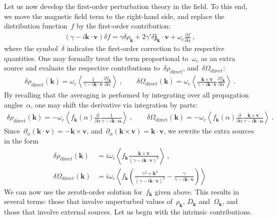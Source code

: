 \documentclass[preprint,aps,eqsecnum]{revtex4-1}
\begin{document}
Let us now develop the first-order perturbation theory in the field.
To this end, we move the magnetic field term to the right-hand
side, and replace the distribution function~$f$ by the first-order
contribution:
\begin{align}
  (\gamma - i {\bm k} \cdot {\bm v})\delta f =
  \gamma \delta \rho_{\bm k} + 2 \gamma' \delta{\bm j}_{\bm k}
  \cdot {\bm v} + \omega_c \frac{\partial f}{\partial \alpha}\ ,
\end{align}
where the symbol~$\delta$ indicates the first-order correction
to the respective quantities. One may formally treat the
term proportional to~$\omega_c$ as an extra source and evaluate
the respective contributions to~$\delta \rho_\mathrm{direct}$,
and~$\delta \Omega_\mathrm{direct}$:
\begin{align}
  \delta \rho_\mathrm{direct}({\bm k})
  = \omega_c \left\langle \frac{1}{\gamma  - i {\bm k}\cdot{\bm v}}
     \frac{\partial f_{\bm k}}{\partial\alpha}
  \right\rangle
  \ ,
  \qquad
  \delta \Omega_\mathrm{direct}({\bm k})
  = \omega_c \left\langle \frac{{\bm k}\times{\bm v}}{
          \gamma  - i {\bm k}\cdot{\bm v}}
     \frac{\partial f_{\bm k}}{\partial\alpha}
  \right\rangle  \ .
\end{align}
By recalling that the averaging is performed by integrating over
all propagation angles~$\alpha$, one may shift the derivative
via integration by parts:
\begin{align}
  \delta \rho_\mathrm{direct}({\bm k})
  = - \omega_c \left\langle f_{\bm k}(\alpha)
  \frac{\partial}{\partial\alpha} \frac{1}{\gamma
      - i {\bm k}\cdot{\bm \alpha}}
  \right\rangle\ ,
  \qquad
  \delta \Omega_\mathrm{direct}({\bm k})
  = - \omega_c \left\langle f_{\bm k}(\alpha)
  \frac{\partial}{\partial\alpha} \frac{{\bm k}\times{\bm v}}{\gamma
      - i {\bm k}\cdot{\bm \alpha}}
  \right\rangle\ .
\end{align}
Since~$\partial_\alpha({\bm k}\cdot{\bm v}) = - {\bm k}\times{\bm v}$,
and~$\partial_\alpha({\bm k}\times{\bm v}) =  {\bm k}\cdot{\bm v}$,
we rewrite the extra sources in the form
\begin{align}
  \delta \rho_\mathrm{direct}({\bm k}) &= i \omega_c
  \left\langle f_{\bm k} \frac{{\bm k}\times{\bm v}}{
  (\gamma  - i {\bm k}\cdot{\bm v})^2} \right\rangle \ ,
  \\
  \delta \Omega_\mathrm{direct}({\bm k})
  &= i \omega_c \left\langle f_{\bm k} \left(
  \frac{\gamma^2 + {\bm k}^2}{(\gamma - i {\bm k}\cdot{\bm v})^2}
  - \frac{\gamma}{\gamma - i {\bm k} \cdot{\bm v}}
  \right)\right\rangle
\end{align}
We can now use the zeroth-order solution for~$f_{\bm k}$ given above.
This results in several terms: those that involve unperturbed
values of~$\rho_{\bm k}$, $D_{\bm k}$ and~$\Omega_{\bm k}$,
and those that involve external sources. Let us begin with the
intrinsic contributions.
\end{document}
